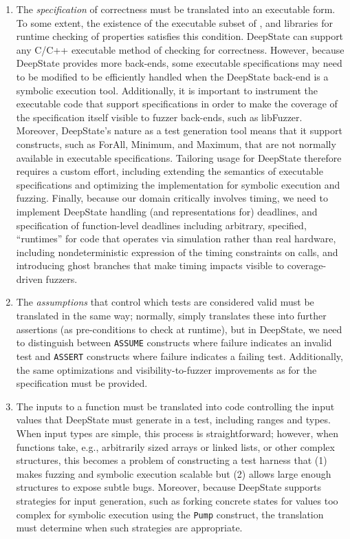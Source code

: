 \begin{enumerate}[labelsep=3pt,leftmargin=12pt]
\item The \emph{specification} of correctness must be translated into an executable form.  To some extent, the existence of the \eacsl executable subset of \acsl, and libraries for runtime checking of properties satisfies this condition.  DeepState can support any C/C++ executable method of checking for correctness.  However, because DeepState provides more back-ends, some executable specifications may need to be modified to be efficiently handled when the DeepState back-end is a symbolic execution tool.  Additionally, it is important to instrument the executable code that support specifications in order to make the coverage of the specification itself visible to fuzzer back-ends, such as libFuzzer.  Moreover, DeepState's nature as a test generation tool means that it support constructs, such as ForAll, Minimum, and Maximum, that are not normally available in executable specifications.  Tailoring \eacsl usage for DeepState therefore requires a custom effort, including extending the semantics of executable specifications and optimizing the implementation for symbolic execution and fuzzing.  Finally, because our domain critically involves timing, we need to implement DeepState handling (and \eacsl representations for) deadlines, and specification of function-level deadlines including arbitrary, specified, ``runtimes'' for code that operates via simulation rather than real hardware, including nondeterministic expression of the timing constraints on calls, and introducing ghost branches that make timing impacts visible to coverage-driven fuzzers.
\item The \emph{assumptions} that control which tests are considered valid must be translated in the same way; normally, \eacsl simply translates these into further assertions (as pre-conditions to check at runtime), but in DeepState, we need to distinguish between {\tt ASSUME} constructs where failure indicates an invalid test and {\tt ASSERT} constructs where failure indicates a failing test.  Additionally, the same optimizations and visibility-to-fuzzer improvements as for the specification must be provided.
\item The inputs to a function must be translated into code controlling the input values that DeepState must generate in a test, including ranges and types.  When input types are simple, this process is straightforward; however, when functions take, e.g., arbitrarily sized arrays or linked lists, or other complex structures, this becomes a problem of constructing a test harness that (1) makes fuzzing and symbolic execution scalable but (2) allows large enough structures to expose subtle bugs.  Moreover, because DeepState supports strategies for input generation, such as forking concrete states for values too complex for symbolic execution using the {\tt Pump} construct, the translation must determine when such strategies are appropriate.

\end{enumerate}
